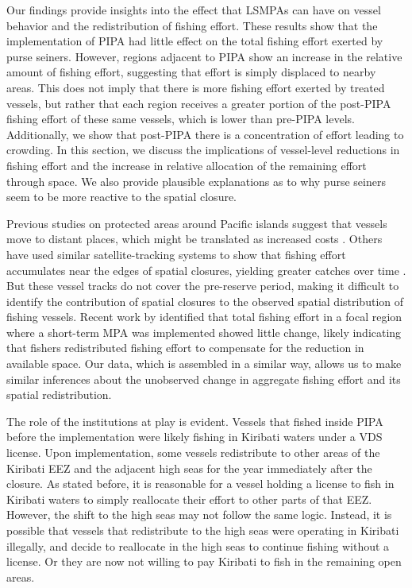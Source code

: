 \documentclass[9pt,twoside,lineno]{pnas-new}
\begin{document}
Our findings provide insights into the effect that LSMPAs
can have on vessel behavior and the redistribution of fishing effort.
These results show that the implementation of PIPA had
little effect on the total fishing effort exerted by purse seiners. However, regions
adjacent to PIPA show an increase in the relative amount of fishing
effort, suggesting that effort is simply displaced to nearby areas.
This does not imply that there is more fishing effort exerted by treated
vessels, but rather that each region receives a greater portion of the
post-PIPA fishing effort of these same vessels, which is lower than
pre-PIPA levels. Additionally, we show that post-PIPA there is a
concentration of effort leading to crowding. In this section, we discuss
the implications of vessel-level reductions in fishing effort and the
increase in relative allocation of the remaining effort through space.
We also provide plausible explanations as to why purse seiners seem to
be more reactive to the spatial closure.

Previous studies on protected areas around Pacific islands suggest that vessels move to
distant places, which might be translated as increased costs
\citep{stevenson_2013}. Others have used similar satellite-tracking systems to
show that fishing effort accumulates near the edges of spatial closures,
yielding greater catches over time \citep{murawski_2005}. But these vessel tracks
do not cover the pre-reserve period, making it difficult to identify the
contribution of spatial closures to the observed spatial distribution of
fishing vessels. Recent work by \cite{elahi_2018} identified that total
fishing effort in a focal region where a short-term MPA was implemented
showed little change, likely indicating that fishers redistributed
fishing effort to compensate for the reduction in available space. Our
data, which is assembled in a similar way, allows us to make similar
inferences about the unobserved change in aggregate fishing effort and
its spatial redistribution.

The role of the institutions at play is evident. Vessels that fished
inside PIPA before the implementation were likely fishing in
Kiribati waters under a VDS license. Upon implementation,
some vessels redistribute to other areas of the Kiribati EEZ and the adjacent
high seas for the year immediately after the closure. As stated before,
it is reasonable for a vessel holding a license to fish in Kiribati
waters to simply reallocate their effort to other parts of that EEZ.
However, the shift to the high seas may not follow the same logic.
Instead, it is possible that vessels that redistribute to the high seas
were operating in Kiribati illegally, and decide to reallocate in the
high seas to continue fishing without a license. Or they are now not willing to pay Kiribati to fish in the remaining open areas.
\end{document}
